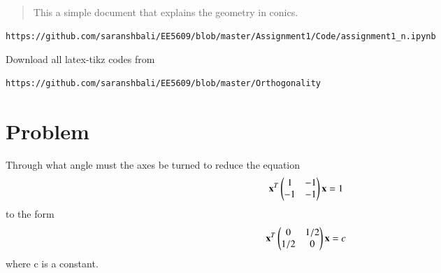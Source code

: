 \documentclass[journal,12pt,twocolumn]{IEEEtran}
\begin{document}
%
\begin{abstract}
This a simple document that explains the geometry in conics.
\end{abstract}
%
\begin{lstlisting}
https://github.com/saranshbali/EE5609/blob/master/Assignment1/Code/assignment1_n.ipynb
\end{lstlisting}
%
Download all latex-tikz codes from 
% 
\begin{lstlisting}
https://github.com/saranshbali/EE5609/blob/master/Orthogonality
\end{lstlisting}
%
\section{Problem}
Through what angle must the axes be turned to reduce the equation
\begin{align}
	\mathbf{x}^T\begin{pmatrix} 1 & -1 \\ -1 & -1\end{pmatrix}\mathbf{x} = 1 \label{1}
\end{align}
to the form
\begin{align}
	\mathbf{x}^T\begin{pmatrix} 0 & 1/2 \\ 1/2 & 0\end{pmatrix}\mathbf{x} = c \label{3}
\end{align}
where c is a constant.
\end{document}

